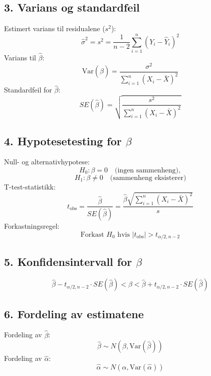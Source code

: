 \documentclass[a4paper,11pt]{article}
\begin{document}
\begin{footnotesize}
\begin{multicols}{2}
\begin{minipage}{\linewidth}
\end{minipage}
\begin{minipage}{\linewidth}

\subsection*{3. Varians og standardfeil}
Estimert varians til residualene (\(s^2\)):
\[
\hat{\sigma}^2 = s^2 = \frac{1}{n-2} \sum_{i=1}^n \left(Y_i - \hat{Y}_i\right)^2
\]
Varians til \(\hat{\beta}\):
\[
\text{Var}(\hat{\beta}) = \frac{\sigma^2}{\sum_{i=1}^n (X_i - \bar{X})^2}
\]
Standardfeil for \(\hat{\beta}\):
\[
SE(\hat{\beta}) = \sqrt{\frac{s^2}{\sum_{i=1}^n (X_i - \bar{X})^2}}
\]

\end{minipage}
\begin{minipage}{\linewidth}

\subsection*{4. Hypotesetesting for \(\beta\)}
Null- og alternativhypotese:
\[
H_0: \beta = 0 \quad \text{(ingen sammenheng)}, 
\]
\[
H_1: \beta \neq 0 \quad \text{(sammenheng eksisterer)}
\]
T-test-statistikk:
\[
t_{\text{obs}} = \frac{\hat{\beta}}{SE(\hat{\beta})} = \frac{\hat{\beta} \sqrt{\sum_{i=1}^n (X_i - \bar{X})^2}}{s}
\]
Forkastningsregel:
\[
\text{Forkast } H_0 \text{ hvis } |t_{\text{obs}}| > t_{\alpha/2, n-2}
\]

\end{minipage}
\begin{minipage}{\linewidth}

\subsection*{5. Konfidensintervall for \(\beta\)}
\[
\hat{\beta} - t_{\alpha/2, n-2} \cdot SE(\hat{\beta}) < \beta < \hat{\beta} + t_{\alpha/2, n-2} \cdot SE(\hat{\beta})
\]

\end{minipage}
\begin{minipage}{\linewidth}

\subsection*{6. Fordeling av estimatene}
Fordeling av \(\hat{\beta}\):
\[
\hat{\beta} \sim N\left(\beta, \text{Var}(\hat{\beta})\right)
\]
Fordeling av \(\hat{\alpha}\):
\[
\hat{\alpha} \sim N\left(\alpha, \text{Var}(\hat{\alpha})\right)
\]



\end{minipage}
\end{multicols}
\end{footnotesize}
\end{document}
